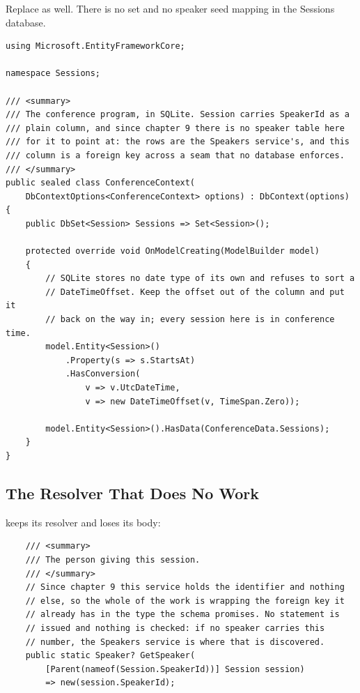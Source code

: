 Replace  as well. There is no 
set and no speaker seed mapping in the Sessions database.

\begin{verbatim}
using Microsoft.EntityFrameworkCore;

namespace Sessions;

/// <summary>
/// The conference program, in SQLite. Session carries SpeakerId as a
/// plain column, and since chapter 9 there is no speaker table here
/// for it to point at: the rows are the Speakers service's, and this
/// column is a foreign key across a seam that no database enforces.
/// </summary>
public sealed class ConferenceContext(
    DbContextOptions<ConferenceContext> options) : DbContext(options)
{
    public DbSet<Session> Sessions => Set<Session>();

    protected override void OnModelCreating(ModelBuilder model)
    {
        // SQLite stores no date type of its own and refuses to sort a
        // DateTimeOffset. Keep the offset out of the column and put it
        // back on the way in; every session here is in conference time.
        model.Entity<Session>()
            .Property(s => s.StartsAt)
            .HasConversion(
                v => v.UtcDateTime,
                v => new DateTimeOffset(v, TimeSpan.Zero));

        model.Entity<Session>().HasData(ConferenceData.Sessions);
    }
}
\end{verbatim}

\subsection{The Resolver That Does No Work}

%
 keeps its resolver and loses its body:

\begin{verbatim}
    /// <summary>
    /// The person giving this session.
    /// </summary>
    // Since chapter 9 this service holds the identifier and nothing
    // else, so the whole of the work is wrapping the foreign key it
    // already has in the type the schema promises. No statement is
    // issued and nothing is checked: if no speaker carries this
    // number, the Speakers service is where that is discovered.
    public static Speaker? GetSpeaker(
        [Parent(nameof(Session.SpeakerId))] Session session)
        => new(session.SpeakerId);
\end{verbatim}

